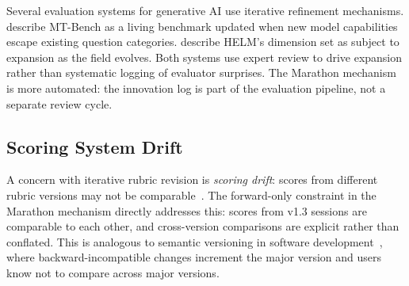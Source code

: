 Several evaluation systems for generative AI use iterative refinement mechanisms.
\citet{zheng2023judging} describe MT-Bench as a living benchmark updated when
new model capabilities escape existing question categories. \citet{liang2022holistic}
describe HELM's dimension set as subject to expansion as the field evolves.
Both systems use expert review to drive expansion rather than systematic logging of
evaluator surprises. The Marathon mechanism is more automated: the innovation log
is part of the evaluation pipeline, not a separate review cycle.

\subsection{Scoring System Drift}

A concern with iterative rubric revision is \textit{scoring drift}: scores from
different rubric versions may not be comparable~\cite{angoff1971scales}. The
forward-only constraint in the Marathon mechanism directly addresses this: scores
from v1.3 sessions are comparable to each other, and cross-version comparisons
are explicit rather than conflated. This is analogous to semantic versioning in
software development~\cite{semver}, where backward-incompatible changes increment
the major version and users know not to compare across major versions.
